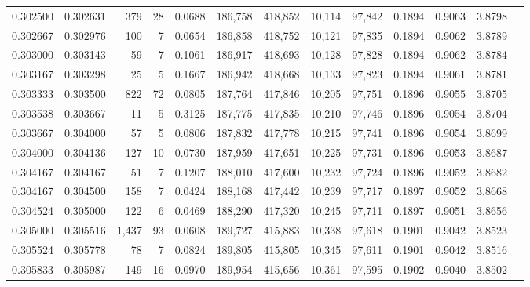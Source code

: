 \begin{tabular}{rrrrrrrrrrrrr}
0.302500 & 0.302631 &   379 &  28 &                                     0.0688 & 186,758 & 418,852 &  10,114 &  97,842 & 0.1894 & 0.9063 & 3.8798 \\
0.302667 & 0.302976 &   100 &   7 &                                     0.0654 & 186,858 & 418,752 &  10,121 &  97,835 & 0.1894 & 0.9062 & 3.8789 \\
0.303000 & 0.303143 &    59 &   7 &                                     0.1061 & 186,917 & 418,693 &  10,128 &  97,828 & 0.1894 & 0.9062 & 3.8784 \\
0.303167 & 0.303298 &    25 &   5 &                                     0.1667 & 186,942 & 418,668 &  10,133 &  97,823 & 0.1894 & 0.9061 & 3.8781 \\
0.303333 & 0.303500 &   822 &  72 &                                     0.0805 & 187,764 & 417,846 &  10,205 &  97,751 & 0.1896 & 0.9055 & 3.8705 \\
0.303538 & 0.303667 &    11 &   5 &                                     0.3125 & 187,775 & 417,835 &  10,210 &  97,746 & 0.1896 & 0.9054 & 3.8704 \\
0.303667 & 0.304000 &    57 &   5 &                                     0.0806 & 187,832 & 417,778 &  10,215 &  97,741 & 0.1896 & 0.9054 & 3.8699 \\
0.304000 & 0.304136 &   127 &  10 &                                     0.0730 & 187,959 & 417,651 &  10,225 &  97,731 & 0.1896 & 0.9053 & 3.8687 \\
0.304167 & 0.304167 &    51 &   7 &                                     0.1207 & 188,010 & 417,600 &  10,232 &  97,724 & 0.1896 & 0.9052 & 3.8682 \\
0.304167 & 0.304500 &   158 &   7 &                                     0.0424 & 188,168 & 417,442 &  10,239 &  97,717 & 0.1897 & 0.9052 & 3.8668 \\
0.304524 & 0.305000 &   122 &   6 &                                     0.0469 & 188,290 & 417,320 &  10,245 &  97,711 & 0.1897 & 0.9051 & 3.8656 \\
0.305000 & 0.305516 & 1,437 &  93 &                                     0.0608 & 189,727 & 415,883 &  10,338 &  97,618 & 0.1901 & 0.9042 & 3.8523 \\
0.305524 & 0.305778 &    78 &   7 &                                     0.0824 & 189,805 & 415,805 &  10,345 &  97,611 & 0.1901 & 0.9042 & 3.8516 \\
0.305833 & 0.305987 &   149 &  16 &                                     0.0970 & 189,954 & 415,656 &  10,361 &  97,595 & 0.1902 & 0.9040 & 3.8502 \\

\end{tabular}
